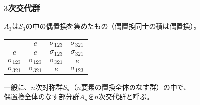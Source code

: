 \documentclass[12pt, t]{beamer}
\begin{document}
\begin{frame}
\frametitle{$3$次交代群}
$A_3$は$S_3$の中の偶置換を集めたもの（偶置換同士の積は偶置換）。
\begin{center}
\begin{tabular}{c|ccc}
                 &$e$           &$\sigma_{123}$&$\sigma_{321}$\\ \hline
  $e$            &$e$           &$\sigma_{123}$&$\sigma_{321}$\\
  $\sigma_{123}$ &$\sigma_{123}$&$\sigma_{321}$&$e$ \\
  $\sigma_{321}$ &$\sigma_{321}$&$e$           &$\sigma_{123}$
\end{tabular}
\end{center}

一般に、$n$次対称群$S_n$（$n$要素の置換全体のなす群）の中で、\\
偶置換全体のなす部分群$A_n$を$n$次交代群と呼ぶ。
\end{frame}
\end{document}
